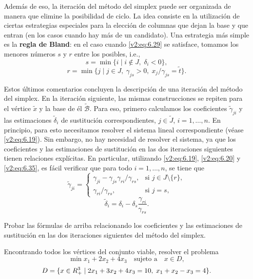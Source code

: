 Además de eso, la iteración del método del simplex puede ser organizada de manera que elimine la posibilidad de ciclo. La idea consiste en la utilización de ciertas estrategias especiales para la elección de columnas que dejan la base y que entran (en los casos cuando hay más de un candidato). Una estrategia más simple es la \textbf{regla de Bland}: en el caso cuando \eqref{v2:eq:6.29} se satisface, tomamos los menores números $s$ y $r$ entre los posibles, i.e.,
\[
    s = \min \{ i \mid i \notin J, \; \delta_i < 0 \},
\]
\[
    r = \min \{ j \mid j \in J, \; \gamma_{js} > 0, \; x_j / \gamma_{js} = \tilde{t} \}.
\]

Estos últimos comentarios concluyen la descripción de una iteración del método del simplex. En la iteración siguiente, las mismas construcciones se repiten para el vértice $\tilde{x}$ y la base de él $\tilde{\mathcal{B}}$. Para eso, primero calculamos los coeficientes $\tilde{\gamma}_{ji}$ y las estimaciones $\tilde{\delta}_i$ de sustitución correspondientes, $j \in \tilde{J}$, $i = 1, \dots, n$. En principio, para esto necesitamos resolver el sistema lineal correspondiente (véase \eqref{v2:eq:6.19}). Sin embargo, no hay necesidad de resolver el sistema, ya que los coeficientes y las estimaciones de sustitución en las dos iteraciones siguientes tienen relaciones explícitas. En particular, utilizando \eqref{v2:eq:6.19}, \eqref{v2:eq:6.20} y \eqref{v2:eq:6.35}, es fácil verificar que para todo $i = 1, \dots, n$, se tiene que
\[
    \tilde{\gamma}_{ji} = \begin{cases} 
        \gamma_{ji} - \gamma_{js} \gamma_{ri} / \gamma_{rs}, & \text{si } j \in J \setminus \{r\}, \\
        \gamma_{ri} / \gamma_{rs}, & \text{si } j = s,
    \end{cases}
\]
\[
    \tilde{\delta}_i = \delta_i - \delta_s \frac{\gamma_{ri}}{\gamma_{rs}}.
\]

\begin{exercise}\label{v2:ejer:6.1.12}
    Probar las fórmulas de arriba relacionando los coeficientes y las estimaciones de sustitución en las dos iteraciones siguientes del método del simplex.
\end{exercise}

\begin{exercise}\label{v2:ejer:6.1.13}
    Encontrando todos los vértices del conjunto viable, resolver el problema
    \[
        \min x_1 + 2x_2 + 4x_3 \quad \text{sujeto a} \quad x \in D,
    \]
    \[
        D = \{ x \in R^3_+ \mid 2x_1 + 3x_2 + 4x_3 = 10, \; x_1 + x_2 - x_3 = 4 \}.
    \]
\end{exercise}

